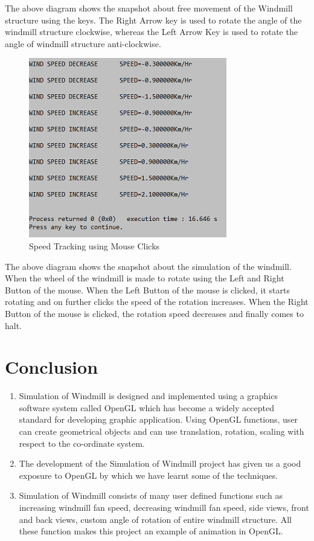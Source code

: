 \documentclass[fontsize=12pt]{article}
\begin{document}
The above diagram shows the snapshot about free movement of the Windmill structure using the keys. The Right Arrow key is used to rotate the angle of the windmill structure clockwise, whereas the Left Arrow Key is used to rotate the angle of windmill structure anti-clockwise.\\

\begin{figure}[h]
	\centering
  	\includegraphics{F6.PNG}
  	\caption{Speed Tracking using Mouse Clicks}
  	\label{fig:Custom}
\end{figure}

The above diagram shows the snapshot about the simulation of the windmill. When the wheel of the windmill is made to rotate using the Left and Right Button of the mouse. When the Left Button of the mouse is clicked, it starts rotating and on further clicks the speed of the rotation increases. When the Right Button of the mouse is clicked, the rotation speed decreases and finally comes to halt.


\section{Conclusion}
\begin{enumerate}
\item Simulation of Windmill is designed and implemented using a graphics software system called OpenGL which has become a widely accepted standard for developing graphic application. Using OpenGL functions, user can create geometrical objects and can use translation, rotation, scaling with respect to the co-ordinate system.
\item The development of the Simulation of Windmill project has given us a good exposure to OpenGL by which we have learnt some of the techniques.
\item Simulation of Windmill consists of many user defined functions such as increasing windmill fan speed, decreasing windmill fan speed, side views, front and back views, custom angle of rotation of entire windmill structure. All these function makes this project an example of animation in OpenGL.
\end{enumerate}




\end{document}
